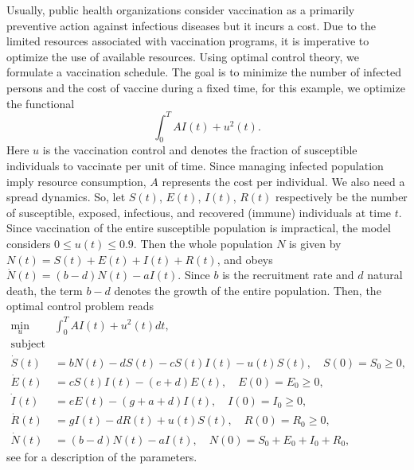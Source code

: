 Usually, public health organizations consider vaccination as a
primarily preventive action against infectious diseases but it incurs a cost.%
Due to the limited resources associated with vaccination programs, it is imperative
to optimize the use of available resources. Using optimal control theory, we
formulate a vaccination schedule. The goal is to minimize the number of infected
persons and the cost of vaccine during a fixed time, for this example, we 
optimize the functional
$$
  \int_{0}^{T}
    A I(t) + u^2(t) .
$$
Here $u$ is the vaccination control and denotes the fraction of
susceptible individuals to vaccinate per unit of time. Since managing infected 
population imply resource consumption, $A$ represents the cost per individual.
We also need a spread dynamics. So, let $S(t)$, $E(t)$, $I(t)$, $R(t)$
respectively be the number of susceptible, exposed, infectious, and recovered
(immune) individuals at time $t$. Since vaccination of
the entire susceptible population is impractical, the model considers 
$0 \leq u(t) \leq 0.9$. Then the whole population $N$ is given by 
$N(t) = S(t) + E(t) + I(t) + R (t)$, and obeys
$
  \dot{N}(t) =
    (b - d)N(t) - aI(t).
$
Since $b$ is the recruitment rate and $d$ natural death, the term $b-d$ denotes 
the growth of the entire population. Then, the optimal control problem reads
%
%
\begin{equation} \label{eqn:epidemics_lenhart}
  \begin{aligned}
    \min_{u} & \int_{0}^{T} AI(t) + u^{2}(t) dt,
    \\
    \text{subject to}
    \\
      \dot{S}(t) &=
          bN(t) - dS(t) - cS(t)I(t) - u(t)S(t), \quad S(0) = S_0 \geq 0,   \\
      \dot{E}(t) &=
          cS(t)I(t) - (e + d)E(t), \quad E(0) = E_0 \geq 0,    \\
      \dot{I}(t) &=
          eE(t) - (g + a +d)I(t), \quad I(0) = I_0 \geq 0,     \\
      \dot{R}(t) &=
          gI(t) -dR(t) + u(t)S(t), \quad R(0) = R_0 \geq 0,    \\
        \dot{N}(t) &=
          (b - d)N(t) - aI(t), \quad N(0)= S_0 + E_0 + I_0 + R_0, 
  \end{aligned}
\end{equation}
see  for a description of the parameters.

